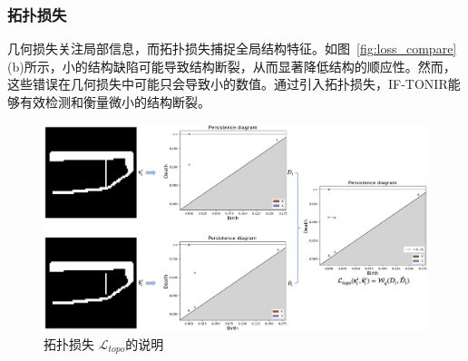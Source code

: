 \subsubsection{拓扑损失}
几何损失关注局部信息，而拓扑损失捕捉全局结构特征。如图~\ref{fig:loss_compare}(b)所示，小的结构缺陷可能导致结构断裂，从而显著降低结构的顺应性。然而，这些错误在几何损失中可能只会导致小的数值。通过引入拓扑损失，IF-TONIR能够有效检测和衡量微小的结构断裂。
\begin{figure}[htbp]
    \centering
    \includegraphics[width=0.9\linewidth]{./figures/TONIR/topo_illu.png}
    \caption{拓扑损失 $\mathcal{L}_{topo}$的说明}
    \label{fig:topo_loss_illu}
\end{figure}

